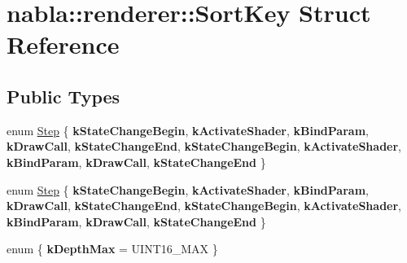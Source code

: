 \hypertarget{structnabla_1_1renderer_1_1_sort_key}{}\section{nabla\+::renderer\+::Sort\+Key Struct Reference}
\label{structnabla_1_1renderer_1_1_sort_key}
\subsection*{Public Types}
\begin{DoxyCompactItemize}
\item 
enum \mbox{\hyperlink{structnabla_1_1renderer_1_1_sort_key_ae0121b7c60133bb8c0bf82785307f53a}{Step}} \{ \newline
{\bfseries k\+State\+Change\+Begin}, 
{\bfseries k\+Activate\+Shader}, 
{\bfseries k\+Bind\+Param}, 
{\bfseries k\+Draw\+Call}, 
\newline
{\bfseries k\+State\+Change\+End}, 
{\bfseries k\+State\+Change\+Begin}, 
{\bfseries k\+Activate\+Shader}, 
{\bfseries k\+Bind\+Param}, 
\newline
{\bfseries k\+Draw\+Call}, 
{\bfseries k\+State\+Change\+End}
 \}
\item 
enum \mbox{\hyperlink{structnabla_1_1renderer_1_1_sort_key_ae0121b7c60133bb8c0bf82785307f53a}{Step}} \{ \newline
{\bfseries k\+State\+Change\+Begin}, 
{\bfseries k\+Activate\+Shader}, 
{\bfseries k\+Bind\+Param}, 
{\bfseries k\+Draw\+Call}, 
\newline
{\bfseries k\+State\+Change\+End}, 
{\bfseries k\+State\+Change\+Begin}, 
{\bfseries k\+Activate\+Shader}, 
{\bfseries k\+Bind\+Param}, 
\newline
{\bfseries k\+Draw\+Call}, 
{\bfseries k\+State\+Change\+End}
 \}
\item 
\mbox{\label{structnabla_1_1renderer_1_1_sort_key_a52072fa2e4b8a22b9dc3ce8c578ffb0c}} 
enum \{ {\bfseries k\+Depth\+Max} = U\+I\+N\+T16\+\_\+\+M\+AX
 \}
\end{DoxyCompactItemize}
